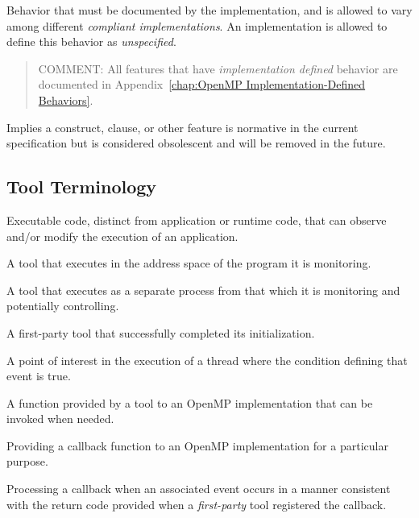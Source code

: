 \glossarydefstart
Behavior that must be documented by the implementation, and is allowed to vary
among different \emph{compliant implementations}. An implementation is allowed to
define this behavior as \emph{unspecified}.

\begin{quote}
COMMENT: All features that have \emph{implementation defined} behavior
are documented in Appendix~\ref{chap:OpenMP Implementation-Defined Behaviors}.
\end{quote}
\glossarydefend

\glossarydefstart
Implies a construct, clause, or other feature is normative in the current specification but is considered obsolescent and will be removed in the future.
\glossarydefend

\subsection{Tool Terminology}

\glossarydefstart
Executable code, distinct from application or runtime code, that can observe and/or modify the execution of an application.
\glossarydefend

\glossarydefstart
A tool that executes in the address space of the program it is monitoring.
\glossarydefend

\glossarydefstart
A tool that executes as a separate process from that which it is monitoring and potentially controlling.
\glossarydefend

\glossarydefstart
A first-party tool that successfully completed its initialization.
\glossarydefend

\glossarydefstart
A point of interest in the execution of a thread where the condition
defining that event is true.
\glossarydefend

\glossarydefstart
A function provided by a tool to an OpenMP implementation that can be invoked when needed.
\glossarydefend

\glossarydefstart
Providing a callback function to an OpenMP implementation for a particular purpose.
\glossarydefend

\glossarydefstart
Processing a callback when an associated event occurs in a manner consistent with the return code
provided when a \emph{first-party} tool registered the callback.
\glossarydefend

